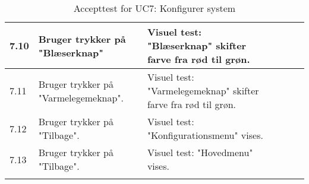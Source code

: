 \begin{longtable}{| l | >{\raggedright}X | >{\raggedright}X | >{\raggedright}X | >{\raggedright\arraybackslash}p{2.3cm} |}
    7.10 & Bruger trykker på "Blæserknap" & Visuel test: "Blæserknap" skifter farve fra rød til grøn. & ~ & ~ \\ \hline
    7.11 & Bruger trykker på "Varmelegemeknap". & Visuel test: "Varmelegemeknap" skifter farve fra rød til grøn. & ~ & ~ \\ \hline
    7.12 & Bruger trykker på "Tilbage". & Visuel test: "Konfigurationsmenu" vises. & ~ & ~ \\ \hline
    7.13 & Bruger trykker på "Tilbage". & Visuel test: "Hovedmenu" vises. & ~ & ~ \\ \hline
	\caption{Accepttest for UC7: Konfigurer system}\label{tbl:acceptUC7}
\end{longtable}